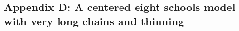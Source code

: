 \documentclass[american,]{article}
\let\oldparagraph\paragraph
\renewcommand{\paragraph}[1]{\oldparagraph{#1}\mbox{}}
\theoremstyle{definition}
\begin{document}







\hypertarget{a-centered-eight-schools-model-1}{%
\subsection*{Appendix D: A centered eight schools model with very long chains and
thinning}\label{a-centered-eight-schools-model-1}}

\end{document}
